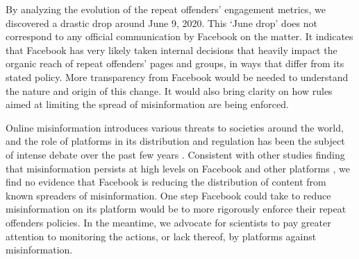 \documentclass[11pt,a4paper]{article}
\begin{document}
{By analyzing the evolution of the repeat offenders’ engagement metrics, we discovered a drastic drop around June 9, 2020. 
This `June drop' does not correspond to any official communication by Facebook on the matter. 
It indicates that Facebook has very likely taken internal decisions that heavily impact the organic reach of repeat offenders' pages and groups, in ways that differ from its stated policy. 
More transparency from Facebook would be needed to understand the nature and origin of this change. 
It would also bring clarity on how rules aimed at limiting the spread of misinformation are being enforced.

Online misinformation introduces various threats to societies around the world, and the role of platforms in its distribution and regulation has been the subject of intense debate over the past few years \citep{rogers2020deplatforming, de2020internet}. 
Consistent with other studies finding that misinformation persists at high levels on Facebook and other platforms \citep{kornbluh2020new, resnick2018iffy}, we find no evidence that Facebook is reducing the distribution of content from known spreaders of misinformation. 
One step Facebook could take to reduce misinformation on its platform would be to more rigorously enforce their repeat offenders policies. 
In the meantime, we advocate for scientists to pay greater attention to monitoring the actions, or lack thereof, by platforms against misinformation. 
}
 


\end{document}
